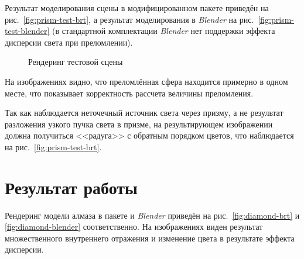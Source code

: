 \documentclass[a4paper,10pt]{article}
\begin{document}
Результат моделирования сцены в модифицированном пакете приведён на рис.~\ref{fig:prism-test-brt},
а результат моделирования в \textit{Blender} на рис.~\ref{fig:prism-test-blender} 
(в стандартной комплектации \textit{Blender} нет поддержки эффекта дисперсии света при преломлении).
\begin{figure}
  \centering
  \quad
  \caption{Рендеринг тестовой сцены}
  \label{fig:prism-test-results}
\end{figure}

На изображениях видно, что преломлённая сфера находится примерно в одном месте, 
что показывает корректность рассчета величины преломления.

Так как наблюдается неточечный источник света через призму,
а не результат разложения узкого пучка света в призме, 
на результирующем изображении должна получиться <<радуга>> с обратным порядком цветов, 
что наблюдается на рис.~\ref{fig:prism-test-brt}.

\section{Результат работы}
Рендеринг модели алмаза в пакете и \textit{Blender} приведён на рис.~\ref{fig:diamond-brt} и \ref{fig:diamond-blender} соответственно.
На изображениях виден результат множественного внутреннего отражения и изменение цвета в результате эффекта дисперсии.
\end{document}
